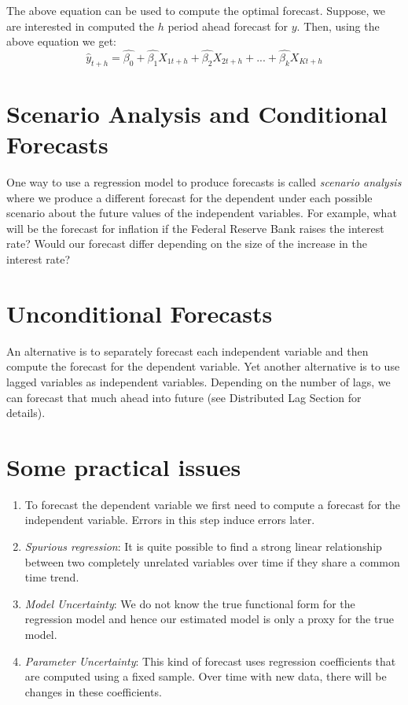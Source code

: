 \documentclass[]{book}
\theoremstyle{definition}
\theoremstyle{definition}
\theoremstyle{definition}
\theoremstyle{remark}
\begin{document}
The above equation can be used to compute the optimal forecast. Suppose, we are interested in computed the \(h\) period ahead forecast for \(y\). Then, using the above equation we get:
\begin{equation}
        \widehat{y}_{t+h} =  \widehat{\beta_0} +\widehat{\beta_1} X_{1t+h} +\widehat{\beta_2} X_{2t+h}+...+ \widehat{\beta_k} X_{Kt+h}
    \end{equation}

\hypertarget{scenario-analysis-and-conditional-forecasts}{%
\section{Scenario Analysis and Conditional Forecasts}\label{scenario-analysis-and-conditional-forecasts}}

One way to use a regression model to produce forecasts is called
\emph{scenario analysis} where we produce a different forecast for the dependent under each possible scenario about the future values of the independent variables. For example, what will be the forecast for inflation if the Federal Reserve Bank raises the interest rate? Would our forecast differ depending on the size of the increase in the interest rate?

\hypertarget{unconditional-forecasts}{%
\section{Unconditional Forecasts}\label{unconditional-forecasts}}

An alternative is to separately forecast each independent variable and then compute the forecast for the dependent variable. Yet another alternative is to use lagged variables as independent variables. Depending on the number of lags, we can forecast that much ahead into future (see Distributed Lag Section for details).

\hypertarget{some-practical-issues}{%
\section{Some practical issues}\label{some-practical-issues}}

\begin{enumerate}
\def\labelenumi{\arabic{enumi}.}
\item
  To forecast the dependent variable we first need to compute a forecast for the independent variable. Errors in this step induce errors later.
\item
  \emph{Spurious regression}: It is quite possible to find a strong linear relationship between two completely unrelated variables over time if they share a common time trend.
\item
  \emph{Model Uncertainty}: We do not know the true functional form for the regression model and hence our estimated model is only a proxy for the true model.
\item
  \emph{Parameter Uncertainty}: This kind of forecast uses regression coefficients that are computed using a fixed sample. Over time with new data, there will be changes in these coefficients.
\end{enumerate}
\end{document}
